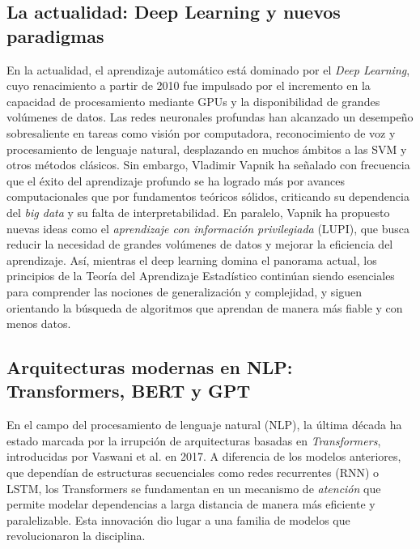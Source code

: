 \documentclass{report}
\begin{document}
\subsection{La actualidad: Deep Learning y nuevos paradigmas}

En la actualidad, el aprendizaje automático está dominado por el \textit{Deep Learning}, cuyo renacimiento a partir de 2010 fue impulsado por el incremento en la capacidad de procesamiento mediante GPUs y la disponibilidad de grandes volúmenes de datos. Las redes neuronales profundas han alcanzado un desempeño sobresaliente en tareas como visión por computadora, reconocimiento de voz y procesamiento de lenguaje natural, desplazando en muchos ámbitos a las SVM y otros métodos clásicos. Sin embargo, Vladimir Vapnik ha señalado con frecuencia que el éxito del aprendizaje profundo se ha logrado más por avances computacionales que por fundamentos teóricos sólidos, criticando su dependencia del \textit{big data} y su falta de interpretabilidad. En paralelo, Vapnik ha propuesto nuevas ideas como el \textit{aprendizaje con información privilegiada} (LUPI), que busca reducir la necesidad de grandes volúmenes de datos y mejorar la eficiencia del aprendizaje. Así, mientras el deep learning domina el panorama actual, los principios de la Teoría del Aprendizaje Estadístico continúan siendo esenciales para comprender las nociones de generalización y complejidad, y siguen orientando la búsqueda de algoritmos que aprendan de manera más fiable y con menos datos.

\subsection[Arquitecturas modernas en NLP]{Arquitecturas modernas en NLP:\\Transformers, BERT y GPT}

En el campo del procesamiento de lenguaje natural (NLP), la última década ha estado marcada por la irrupción de arquitecturas basadas en \textit{Transformers}, introducidas por Vaswani et al. en 2017. A diferencia de los modelos anteriores, que dependían de estructuras secuenciales como redes recurrentes (RNN) o LSTM, los Transformers se fundamentan en un mecanismo de \textit{atención} que permite modelar dependencias a larga distancia de manera más eficiente y paralelizable. Esta innovación dio lugar a una familia de modelos que revolucionaron la disciplina.
\end{document}
